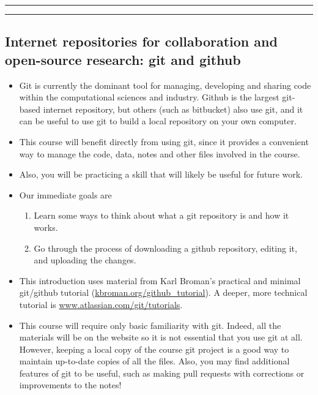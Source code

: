 \documentclass[]{article}
\begin{document}
\begin{center}\rule{0.5\linewidth}{\linethickness}\end{center}

\begin{center}\rule{0.5\linewidth}{\linethickness}\end{center}

\subsection{Internet repositories for collaboration and open-source
research: git and
github}\label{internet-repositories-for-collaboration-and-open-source-research-git-and-github}

\begin{itemize}
\item
  Git is currently the dominant tool for managing, developing and
  sharing code within the computational sciences and industry. Github is
  the largest git-based internet repository, but others (such as
  bitbucket) also use git, and it can be useful to use git to build a
  local repository on your own computer.
\item
  This course will benefit directly from using git, since it provides a
  convenient way to manage the code, data, notes and other files
  involved in the course.
\item
  Also, you will be practicing a skill that will likely be useful for
  future work.
\item
  Our immediate goals are

  \begin{enumerate}
  \def\labelenumi{\roman{enumi}.}
  \item
    Learn some ways to think about what a git repository is and how it
    works.
  \item
    Go through the process of downloading a github repository, editing
    it, and uploading the changes.
  \end{enumerate}
\item
  This introduction uses material from Karl Broman's practical and
  minimal git/github tutorial
  (\href{http://kbroman.org/github_tutorial/}{kbroman.org/github\_tutorial}).
  A deeper, more technical tutorial is
  \href{https://www.atlassian.com/git/tutorials/}{www.atlassian.com/git/tutorials}.
\item
  This course will require only basic familiarity with git. Indeed, all
  the materials will be on the website so it is not essential that you
  use git at all. However, keeping a local copy of the course git
  project is a good way to maintain up-to-date copies of all the files.
  Also, you may find additional features of git to be useful, such as
  making pull requests with corrections or improvements to the notes!
\end{itemize}
\end{document}
